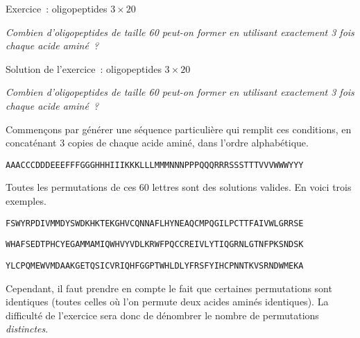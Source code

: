\documentclass[ignorenonframetext,]{beamer}
\begin{document}
\begin{frame}{Exercice~: oligopeptides \(3 \times 20\)}

\emph{Combien d'oligopeptides de taille 60 peut-on former en utilisant
exactement 3 fois chaque acide aminé~?}

\end{frame}

\begin{frame}[fragile]{Solution de l'exercice~: oligopeptides
\(3 \times 20\)}

\emph{Combien d'oligopeptides de taille 60 peut-on former en utilisant
exactement 3 fois chaque acide aminé~?}

Commençons par générer une séquence particulière qui remplit ces
conditions, en concaténant 3 copies de chaque acide aminé, dans l'ordre
alphabétique.

\begin{verbatim}
AAACCCDDDEEEFFFGGGHHHIIIKKKLLLMMMNNNPPPQQQRRRSSSTTTVVVWWWYYY
\end{verbatim}

Toutes les permutations de ces 60 lettres sont des solutions valides. En
voici trois exemples.

\begin{verbatim}
FSWYRPDIVMMDYSWDKHKTEKGHVCQNNAFLHYNEAQCMPQGILPCTTFAIVWLGRRSE
\end{verbatim}

\begin{verbatim}
WHAFSEDTPHCYEGAMMAMIQWHVYVDLKRWFPQCCREIVLYTIQGRNLGTNFPKSNDSK
\end{verbatim}

\begin{verbatim}
YLCPQMEWVMDAAKGETQSICVRIQHFGGPTWHLDLYFRSFYIHCPNNTKVSRNDWMEKA
\end{verbatim}

Cependant, il faut prendre en compte le fait que certaines permutations
sont identiques (toutes celles où l'on permute deux acides aminés
identiques). La difficulté de l'exercice sera donc de dénombrer le
nombre de permutations \emph{distinctes}.

\end{frame}
\end{document}
